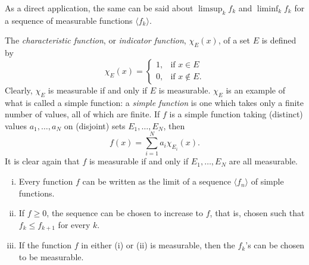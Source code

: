 \documentclass[11pt]{article}
\begin{document}
As a direct application, the same can be said about $\limsup_k f_k$ and $\liminf_k f_k$ for a sequence of measurable functions $\langle f_k \rangle$.

The \textit{characteristic function}, or \textit{indicator function}, $\chi_E(x)$, of a set $E$ is defined by
\[
  \chi_E(x) = 
  \begin{cases}
    1, & \text{if $x \in E$} \\
    0, & \text{if $x \notin E$}.
  \end{cases}
\]
Clearly, $\chi_E$ is measurable if and only if $E$ is measurable.  $\chi_E$ is an example of what is called a simple function: a \textit{simple function} is one which takes only a finite number of values, all of which are finite.  If $f$ is a simple function taking (distinct) values $a_1, \dots, a_N$ on (disjoint) sets $E_1, \dots, E_N$, then
\[
  f(x) = \sum_{i=1}^N a_i \chi_{E_i}(x).
\]
It is clear again that $f$ is measurable if and only if $E_1, \dots, E_N$ are all measurable.

\begin{thm}
  \begin{enumerate}[(i)]
    \item Every function $f$ can be written as the limit of a sequence $\langle f_n \rangle$ of simple functions.

    \item If $f \geqslant 0$, the sequence can be chosen to increase to $f$, that is, chosen such that $f_k \leqslant f_{k+1}$ for every $k$.

    \item If the function $f$ in either (i) or (ii) is measurable, then the $f_k$'s can be chosen to be measurable.
  \end{enumerate}
\end{thm}
\end{document}
